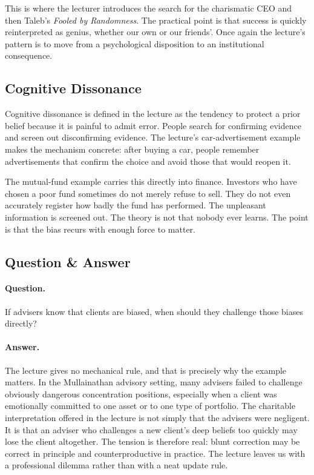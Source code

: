 This is where the lecturer introduces the search for the charismatic CEO and then Taleb's \emph{Fooled by Randomness}. The practical point is that success is quickly reinterpreted as genius, whether our own or our friends'. Once again the lecture's pattern is to move from a psychological disposition to an institutional consequence.

\subsection{Cognitive Dissonance}

Cognitive dissonance is defined in the lecture as the tendency to protect a prior belief because it is painful to admit error. People search for confirming evidence and screen out disconfirming evidence. The lecture's car-advertisement example makes the mechanism concrete: after buying a car, people remember advertisements that confirm the choice and avoid those that would reopen it.

The mutual-fund example carries this directly into finance. Investors who have chosen a poor fund sometimes do not merely refuse to sell. They do not even accurately register how badly the fund has performed. The unpleasant information is screened out. The theory is not that nobody ever learns. The point is that the bias recurs with enough force to matter.

\subsection{Question \& Answer}

\paragraph{Question.} If advisers know that clients are biased, when should they challenge those biases directly?

\paragraph{Answer.} The lecture gives no mechanical rule, and that is precisely why the example matters. In the Mullainathan advisory setting, many advisers failed to challenge obviously dangerous concentration positions, especially when a client was emotionally committed to one asset or to one type of portfolio. The charitable interpretation offered in the lecture is not simply that the advisers were negligent. It is that an adviser who challenges a new client's deep beliefs too quickly may lose the client altogether. The tension is therefore real: blunt correction may be correct in principle and counterproductive in practice. The lecture leaves us with a professional dilemma rather than with a neat update rule.

